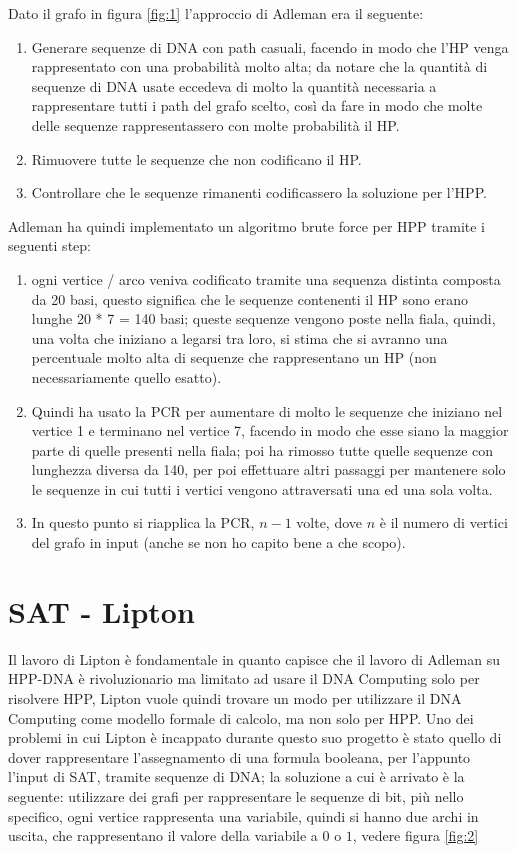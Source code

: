 \documentclass[12pt,a4paper]{report}
\begin{document}
Dato il grafo in figura \ref{fig:1} l'approccio di Adleman era il seguente:
\begin{enumerate}
\item Generare sequenze di DNA con path casuali, facendo in modo che l'HP venga rappresentato con una probabilità molto alta; da notare che la quantità di sequenze di DNA usate eccedeva di molto la quantità necessaria a rappresentare tutti i path del grafo scelto, così da fare in modo che molte delle sequenze rappresentassero con molte probabilità il HP.
\item Rimuovere tutte le sequenze che non codificano il HP.
\item Controllare che le sequenze rimanenti codificassero la soluzione per l'HPP.
\end{enumerate}
Adleman ha quindi implementato un algoritmo brute force per HPP tramite i seguenti step:
\begin{enumerate}
\item ogni vertice / arco veniva codificato tramite una sequenza distinta composta da 20 basi, questo significa che le sequenze contenenti il HP sono erano lunghe 20 * 7 = 140 basi; queste sequenze vengono poste nella fiala, quindi, una volta che iniziano a legarsi tra loro, si stima che si avranno una percentuale molto alta di sequenze che rappresentano un HP (non necessariamente quello esatto).
\item Quindi ha usato la PCR per aumentare di molto le sequenze che iniziano nel vertice 1 e terminano nel vertice 7, facendo in modo che esse siano la maggior parte di quelle presenti nella fiala; poi ha rimosso tutte quelle sequenze con lunghezza diversa da 140, per poi effettuare altri passaggi per mantenere solo le sequenze in cui tutti i vertici vengono attraversati una ed una sola volta.
\item In questo punto si riapplica la PCR, $n-1$ volte, dove $n$ è il numero di vertici del grafo in input (anche se non ho capito bene a che scopo).
\end{enumerate}

\section{SAT - Lipton}
Il lavoro di Lipton è fondamentale in quanto capisce che il lavoro di Adleman su HPP-DNA è rivoluzionario ma limitato ad usare il DNA Computing solo per risolvere HPP, Lipton vuole quindi trovare un modo per utilizzare il DNA Computing come modello formale di calcolo, ma non solo per HPP. Uno dei problemi in cui Lipton è incappato durante questo suo progetto è stato quello di dover rappresentare l'assegnamento di una formula booleana, per l'appunto l'input di SAT, tramite sequenze di DNA; la soluzione a cui è arrivato è la seguente: utilizzare dei grafi per rappresentare le sequenze di bit, più nello specifico, ogni vertice rappresenta una variabile, quindi si hanno due archi in uscita, che rappresentano il valore della variabile a $0$ o $1$, vedere figura \ref{fig:2}
\end{document}
